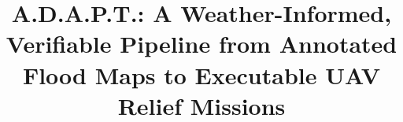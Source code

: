 \documentclass[9pt,a4paper,twocolumn]{extarticle}
\begin{document}
\title{A.D.A.P.T.: A Weather-Informed, Verifiable Pipeline from Annotated Flood Maps to Executable UAV Relief Missions}

\author{}
\date{}

\maketitle















\begingroup
\fontsize{7.5}{8.1}\selectfont


\endgroup
\end{document}
